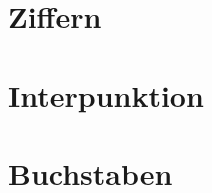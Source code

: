 \documentclass[a4paper,landscape]{article}
\begin{document}
\pagestyle{empty}
%
\newcommand{\showtransition}[2]{%
  \subsection{Übergang #1 - #2 }
  \directlua{\unexpanded{
    from = string.byte(tostring("#1"))-32
    to = string.byte(tostring("#2"))-32
    res = from * 10000 + to * 100
    for index = res,res+99 do
         tex.print("\\IfFileExists{glyph-" .. index .. ".mps}{\\texttt{[image: glyph-" .. index ..".mps]} }{}")
     end
  }}
  \hspace*{-1ex}
  \newpage
}
\tableofcontents
\section{Ziffern}
\section{Interpunktion}
\section{Buchstaben}
\newlength\digitwidth
\digitwidth=2.5cm
\digitwidth=1.75cm
\end{document}
